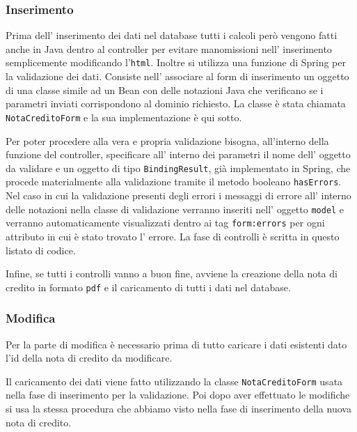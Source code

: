 \documentclass[12pt]{book}
\begin{document}
\subsubsection{Inserimento}
Prima dell' inserimento dei dati nel database tutti i calcoli però vengono 
fatti anche in Java dentro al controller per evitare manomissioni 
nell' inserimento semplicemente modificando l'\texttt{html}.
Inoltre si utilizza una funzione di Spring per la validazione dei dati.
Consiste nell' associare al form di inserimento un oggetto di una classe simile
ad un Bean con delle notazioni Java che verificano se i parametri inviati 
corrispondono al dominio richiesto. La classe è stata chiamata 
\texttt{NotaCreditoForm} e la sua implementazione è qui sotto.

Per poter procedere alla vera e propria validazione bisogna, all'interno della
funzione del controller, specificare all' interno dei 
parametri il nome dell' oggetto da validare e un oggetto di tipo 
\texttt{BindingResult}, già implementato in Spring, che procede materialmente 
alla validazione tramite il metodo booleano \texttt{hasErrors}.
Nel caso in cui la validazione presenti degli errori i messaggi di errore 
all' interno delle notazioni nella classe di validazione verranno inseriti 
nell' oggetto \texttt{model} e verranno automaticamente visualizzati dentro 
ai tag \texttt{form:errors} per ogni attributo in cui è stato trovato l' errore.
La fase di controlli è scritta in questo listato di codice.

Infine, se tutti i controlli vanno a buon fine, avviene la creazione della nota di 
credito in formato \texttt{pdf} e il caricamento di tutti i dati nel database.

\subsubsection{Modifica}
Per la parte di modifica è necessario prima di tutto caricare i dati esistenti
dato l'id della nota di credito da modificare.

Il caricamento dei dati viene fatto utilizzando la classe 
\texttt{NotaCreditoForm} usata nella fase di inserimento per la validazione.
Poi dopo aver effettuato le modifiche si usa la stessa procedura che abbiamo
visto nella fase di inserimento della nuova nota di credito.
\end{document}
